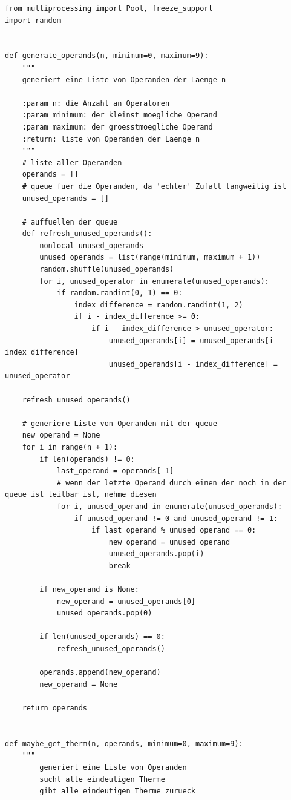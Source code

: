 \documentclass[a4paper,10pt,ngerman]{scrartcl}
\begin{document}
\lstset{
	language=python, 				%
}
\begin{lstlisting}
from multiprocessing import Pool, freeze_support
import random


def generate_operands(n, minimum=0, maximum=9):
    """
    generiert eine Liste von Operanden der Laenge n

    :param n: die Anzahl an Operatoren
    :param minimum: der kleinst moegliche Operand
    :param maximum: der groesstmoegliche Operand
    :return: liste von Operanden der Laenge n
    """
    # liste aller Operanden
    operands = []
    # queue fuer die Operanden, da 'echter' Zufall langweilig ist
    unused_operands = []

    # auffuellen der queue
    def refresh_unused_operands():
        nonlocal unused_operands
        unused_operands = list(range(minimum, maximum + 1))
        random.shuffle(unused_operands)
        for i, unused_operator in enumerate(unused_operands):
            if random.randint(0, 1) == 0:
                index_difference = random.randint(1, 2)
                if i - index_difference >= 0:
                    if i - index_difference > unused_operator:
                        unused_operands[i] = unused_operands[i - index_difference]
                        unused_operands[i - index_difference] = unused_operator

    refresh_unused_operands()

    # generiere Liste von Operanden mit der queue
    new_operand = None
    for i in range(n + 1):
        if len(operands) != 0:
            last_operand = operands[-1]
            # wenn der letzte Operand durch einen der noch in der queue ist teilbar ist, nehme diesen
            for i, unused_operand in enumerate(unused_operands):
                if unused_operand != 0 and unused_operand != 1:
                    if last_operand % unused_operand == 0:
                        new_operand = unused_operand
                        unused_operands.pop(i)
                        break

        if new_operand is None:
            new_operand = unused_operands[0]
            unused_operands.pop(0)

        if len(unused_operands) == 0:
            refresh_unused_operands()

        operands.append(new_operand)
        new_operand = None

    return operands


def maybe_get_therm(n, operands, minimum=0, maximum=9):
    """
        generiert eine Liste von Operanden
        sucht alle eindeutigen Therme
        gibt alle eindeutigen Therme zurueck


\end{lstlisting}
\end{document}
